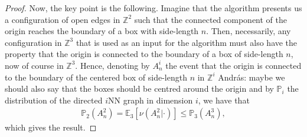\documentclass{article}
\theoremstyle{definition}
\renewcommand{\P}{\mathbb{P}}
\newcommand{\1}{\mathbbm{1}}
\newcommand{\E}{\mathbb{E}}
\newcommand{\0}{\mathbf{o}}
\newcommand{\Z}{\mathbb{Z}}
\begin{document}
\begin{proof}
Now, the key point is the following. Imagine that the algorithm presents us a configuration of open edges in $\Z^2$ such that the connected component of the origin reaches the boundary of a box with side-length $n$. Then, necessarily, any configuration in $\Z^3$ that is used as an input for the algorithm must also have the property that the origin is connected to the boundary of a box of side-length $n$, now of course in  $\Z^3$. Hence, denoting by $A^i_n$ the event that the origin is connected to the boundary of the centered box of side-length $n$ in $\Z^i$  \color{red} András: maybe we should also say that the boxes should be centred around the origin \color{black} and by $\P_i$ the distribution of the directed $i$NN graph in dimension $i$, we have that 
\begin{align*}
\P_2(A^2_n)=\E_3[\nu(A^2_n|\cdot)]\le \P_3(A^3_n), 
\end{align*}
which gives the result.

\end{proof}
\end{document}
